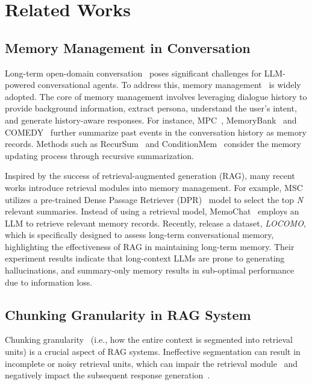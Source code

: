 \section{Related Works}
\subsection{Memory Management in Conversation}
Long-term open-domain conversation~\citep{feng2020doc2dial, xu2022beyond, maharana2024evaluating} poses significant challenges for LLM-powered conversational agents. To address this, memory management~\citep{lu2023memochat, wang2023recursively, zhong2024memorybank, wu2024tokenselect, li2024hello, zhang2024survey} is widely adopted. The core of memory management involves leveraging dialogue history to provide background information, extract persona, understand the user's intent, and generate history-aware responses.
For instance, MPC~\citep{lee2023prompted}, MemoryBank~\citep{zhong2024memorybank} and COMEDY~\citep{chen2024compress} further summarize past events in the conversation history as memory records. Methods such as RecurSum~\citep{wang2023recursively} and ConditionMem~\citep{yuan2023evolving} consider the memory updating process through recursive summarization.

Inspired by the success of retrieval-augmented generation (RAG), many recent works introduce retrieval modules into memory management. For example, MSC~\citep{xu2022beyond} utilizes a pre-trained Dense Passage Retriever (DPR)~\citep{karpukhin2020dense} model to select the top \textit{N} relevant summaries. 
Instead of using a retrieval model, MemoChat~\citep{lu2023memochat} employs an LLM to retrieve relevant memory records.
Recently, \citet{maharana2024evaluating} release a dataset, \textit{LOCOMO}, which is specifically designed to assess long-term conversational memory, highlighting the effectiveness of RAG in maintaining long-term memory. Their experiment results indicate that long-context LLMs are prone to generating hallucinations, and summary-only memory  results in sub-optimal performance due to information loss.

\subsection{Chunking Granularity in RAG System}

Chunking granularity~\citep{duarte2024lumberchunker} (i.e., how the entire context is segmented into retrieval units) is a crucial aspect of RAG systems. Ineffective segmentation can result in incomplete or noisy retrieval units, which can impair the retrieval module~\citep{yu2023chain} and negatively impact the subsequent response generation~\citep{shi2023large}.

